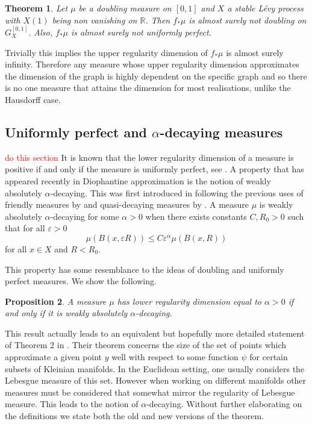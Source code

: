 \documentclass[12pt]{amsart}
\numberwithin{equation}{section}
\newtheorem{thm}{Theorem}[section]
\newtheorem{prop}[thm]{Proposition}
\renewcommand{\le}{\leqslant}
\begin{document}
\begin{thm}
Let $\mu$ be a doubling measure on $[0,1]$ and $X$ a stable L\'evy process with $X(1)$ being non vanishing on $\mathbb{R}$. Then $f_*\mu$ is almost surely not doubling on $G_X^{[0,1]}$. Also, $f_*\mu$ is almost surely not uniformly perfect.


\end{thm}


Trivially this implies the upper regularity dimension of $f_*\mu$ is almost surely infinity. Therefore any measure whose upper regularity dimension approximates the dimension of the graph is highly dependent on the specific graph and so there is no one measure that attains the dimension for most realisations, unlike the Hausdorff case. 




\subsection{Uniformly perfect and $\alpha$-decaying measures}

\textcolor{red}{do this section}
It is known that the lower regularity dimension of a measure is positive if and only if the measure is uniformly perfect, see \cite{antti or fraser-howroyd}. A property that has appeared recently in Diophantine approximation is the notion of weakly absolutely $\alpha$-decaying. This was first introduced in \cite{Sanju et al} following the previous uses of friendly measures by \cite{Kleinvock, Lindenstrauss and Weiss} and quasi-decaying measures by \cite{Das, Fishman, Simmons, Urbanski}. A measure $\mu$ is weakly absolutely $\alpha$-decaying for some $\alpha > 0$ when there exists constants $C, R_0 >0$ such that for all $\varepsilon > 0$
\[
\mu(B(x,\varepsilon R)) \le C \varepsilon^{\alpha} \mu(B(x,R))
\]
for all $x \in X$ and $R<R_0$.

This property has some resemblance to the ideas of doubling and uniformly perfect measures. We show the following.
\begin{prop}
A measure $\mu$ has lower regularity dimension equal to $\alpha > 0$ if and only if it is weakly absolutely $\alpha$-decaying. 
\end{prop}


This result actually leads to an equivalent but hopefully more detailed statement of Theorem 2 in \cite{sanju et al}. Their theorem concerns the size of the set of points which approximate a given point $y$ well with respect to some function $\psi$ for certain subsets of Kleinian manifolds. In the Euclidean setting, one usually considers the Lebesgue measure of this set. However when working on different manifolds other measures must be considered that somewhat mirror the regularity of Lebesgue measure. This leads to the notion of $\alpha$-decaying. Without further elaborating on the definitions we state both the old and new versions of the theorem.
\end{document}
